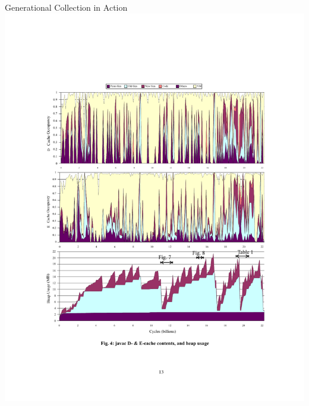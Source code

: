 \documentclass[
14pt,
aspectratio=169,
usenames,
dvipsnames,
x11names]{beamer}
\begin{document}
\begin{frame}{Generational Collection in Action}
  \centering
  \includegraphics[width=\columnwidth, clip, trim=5cm 22.5cm 4.5cm 5cm]{heap}%
  \vspace{-1pt}

\end{frame}
\end{document}
